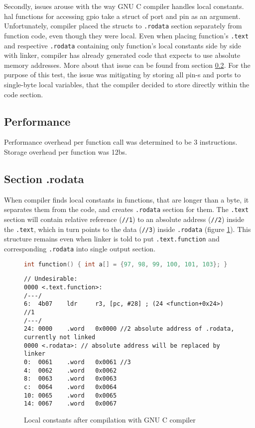 Secondly, issues arouse with the way GNU C compiler handles local constants. \Gls{hal} functions for accessing \gls{gpio} take a struct of port and pin as an argument. Unfortunately, compiler placed the structs to \texttt{.rodata} section separately from function code, even though they were local. Even when placing function's \texttt{.text} and respective \texttt{.rodata} containing only function's local constants side by side with linker, compiler has already generated code that expects to use absolute memory addresses. More about that issue can be found from section \ref{rodata}. For the purpose of this test, the issue was mitigating by storing all pin-s and ports to single-byte local variables, that the compiler decided to store directly within the code section.

\subsection{Performance}

Performance overhead per function call was determined to be 3 instructions. Storage overhead per function was 12\glspl{b}. 


\subsection{Section .rodata}\label{rodata}

When compiler finds local constants in functions, that are longer than a byte, it separates them from the code, and creates \texttt{.rodata} section for them. The \texttt{.text}
section will contain relative reference (\texttt{//1}) to an absolute address (\texttt{//2}) inside the \texttt{.text}, which in turn points to the data (\texttt{//3}) inside \texttt{.rodata} (figure \ref{fig:rodata}). This structure remains even when linker is told to put \texttt{.text.function} and corresponding \texttt{.rodata} into single output section.

\begin{figure} [htb]
\begin{lstlisting}[language=C]
int function() { int a[] = {97, 98, 99, 100, 101, 103}; }
\end{lstlisting}
\begin{lstlisting}[style=asm]
// Undesirable:
0000 <.text.function>:
/---/
6:  4b07    ldr     r3, [pc, #28] ; (24 <function+0x24>) //1
/---/
24: 0000    .word   0x0000 //2 absolute address of .rodata, currently not linked
0000 <.rodata>: // absolute address will be replaced by linker
0:  0061    .word   0x0061 //3
4:  0062    .word   0x0062
8:  0063    .word   0x0063
c:  0064    .word   0x0064
10: 0065    .word   0x0065
14: 0067    .word   0x0067
\end{lstlisting}
\caption{Local constants after compilation with GNU C compiler}
\label{fig:rodata}
\end{figure}

